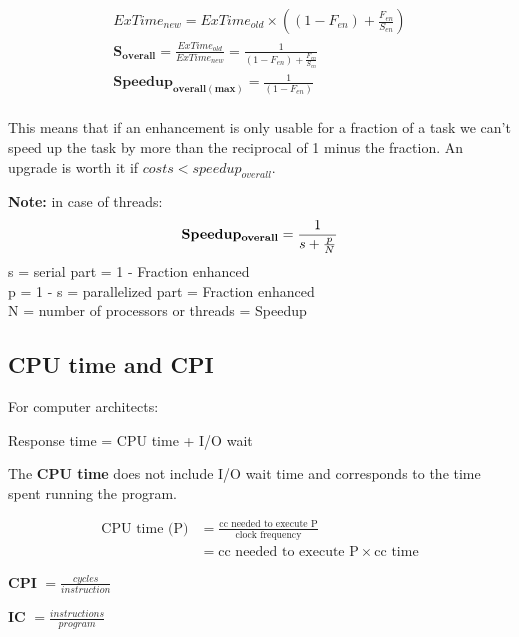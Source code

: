 \begin{gather*}
    ExTime_{new} = ExTime_{old} \times \left( \left( 1 - F_{en} \right) +
\frac{F_{en}}{S_{en}} \right)\\
    \mathbf{S_{overall}} = \frac{ExTime_{old}}{ExTime_{new}} = \frac{1}{\left( 1-F_{en} \right) +
\frac{F_{en}}{S_{en}}}\\
    \mathbf{Speedup_{overall(max)}} = \frac{1}{\left( 1 - F_{en} \right)}\\
\end{gather*}

This means that if an enhancement is only usable for a fraction
of a task we can’t speed up the task by more
than the reciprocal of 1 minus the fraction.
An upgrade is worth it if \(costs < speedup_{overall}\).

\textbf{Note:} in case of threads:
\[\mathbf{Speedup_{overall}} = \frac{1}{s + \frac{p}{N}}\\\]
s = serial part = 1 - Fraction enhanced\\
p = 1 - s = parallelized part = Fraction enhanced\\
N = number of processors or threads = Speedup


\subsection{CPU time and CPI}\label{subsec:cpu-time-and-cpi}
For computer architects:
\begin{center}
    Response time = CPU time + I/O wait
\end{center}

The \textbf{CPU time} does not include I/O wait time and corresponds to the time spent running the program.

\begin{center}
    \begin{align*}
        \text{CPU time (P)} &= \frac{\text{cc needed to execute P}}{\text{clock frequency}}\\
                     &= \text{cc needed to execute P} \times \text{cc time}
    \end{align*}
\end{center}

\begin{center}
    \textbf{CPI} \(=\frac{cycles}{instruction}\)
\end{center}

\begin{center}
    \textbf{IC} \(=\frac{instructions}{program}\)
\end{center}

